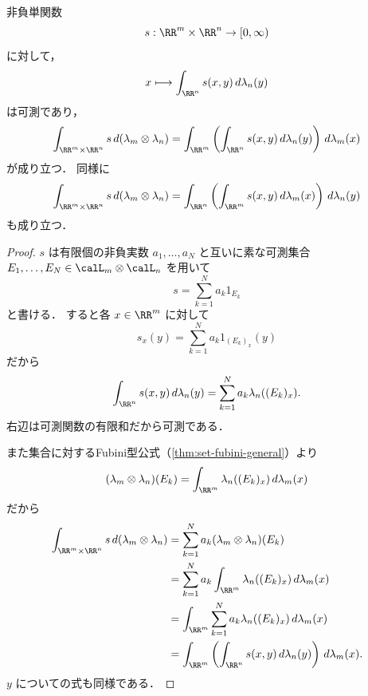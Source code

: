 \begin{theorem}[単関数に対するTonelli]\label{thm:tonelli-simple-functions}
非負単関数
\[
s:\RR^m\times\RR^n\to[0,\infty)
\]
に対して，
\[
x\longmapsto \int_{\RR^n}s(x,y)\,d\lambda_n(y)
\]
は可測であり，
\[
\int_{\RR^m\times\RR^n}s\,d(\lambda_m\otimes\lambda_n)
=
\int_{\RR^m}\left(\int_{\RR^n}s(x,y)\,d\lambda_n(y)\right)\,d\lambda_m(x)
\]
が成り立つ．
同様に
\[
\int_{\RR^m\times\RR^n}s\,d(\lambda_m\otimes\lambda_n)
=
\int_{\RR^n}\left(\int_{\RR^m}s(x,y)\,d\lambda_m(x)\right)\,d\lambda_n(y)
\]
も成り立つ．
\end{theorem}
\begin{proof}
$s$ は有限個の非負実数 $a_1,\dots,a_N$ と互いに素な可測集合
$E_1,\dots,E_N\in\calL_m\otimes\calL_n$ を用いて
\[
s=\sum_{k=1}^N a_k1_{E_k}
\]
と書ける．
すると各 $x\in\RR^m$ に対して
\[
s_x(y)=\sum_{k=1}^N a_k1_{(E_k)_x}(y)
\]
だから
\[
\int_{\RR^n}s(x,y)\,d\lambda_n(y)
=
\sum_{k=1}^N a_k \lambda_n((E_k)_x).
\]
右辺は可測関数の有限和だから可測である．

また集合に対するFubini型公式（\cref{thm:set-fubini-general}）より
\[
(\lambda_m\otimes\lambda_n)(E_k)
=
\int_{\RR^m}\lambda_n((E_k)_x)\,d\lambda_m(x)
\]
だから
\begin{align*}
\int_{\RR^m\times\RR^n}s\,d(\lambda_m\otimes\lambda_n)
&=
\sum_{k=1}^N a_k(\lambda_m\otimes\lambda_n)(E_k) \\
&=
\sum_{k=1}^N a_k\int_{\RR^m}\lambda_n((E_k)_x)\,d\lambda_m(x) \\
&=
\int_{\RR^m}\sum_{k=1}^N a_k\lambda_n((E_k)_x)\,d\lambda_m(x) \\
&=
\int_{\RR^m}\left(\int_{\RR^n}s(x,y)\,d\lambda_n(y)\right)\,d\lambda_m(x).
\end{align*}
$y$ についての式も同様である．
\end{proof}

